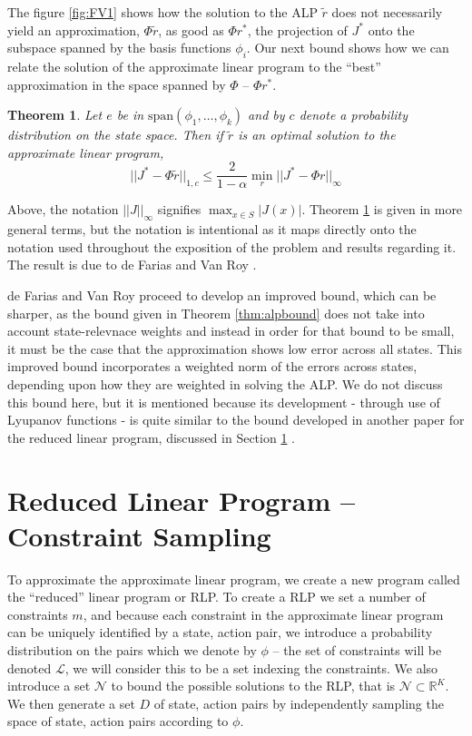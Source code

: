 \documentclass[12pt,reqno]{amsart}
\newtheorem{thm}{Theorem}[section]
\newcommand{\R}{\ensuremath{\mathbb{R}}}
\newcommand{\sN}{\mathcal{N}}
\newcommand{\sL}{\mathcal{L}}
\numberwithin{equation}{section}
\begin{document}
The figure \ref{fig:FV1} shows how the solution to the ALP $\tilde{r}$ does not necessarily yield an approximation, $\Phi\tilde{r}$, as good as $\Phi r^*$, the projection of $J^*$ onto the subspace spanned by the basis functions $\phi_i$. Our next bound shows how we can relate the solution of the approximate linear program to the ``best'' approximation in the space spanned by $\Phi$ -- $\Phi r^*$.

\begin{thm}\label{thm:alpbound2}
Let $e$ be in $\text{span}(\phi_1,\dots,\phi_k)$ and by $c$ denote a probability distribution on the state space. Then if $\tilde{r}$ is an optimal solution to the approximate linear program,
$$
||J^* - \Phi\tilde{r}||_{1,c} \leq \frac{2}{1-\alpha} \min_r || J^* - \Phi r||_{\infty}
$$
\end{thm}

Above, the notation $||J||_{\infty}$ signifies $\max_{x \in S} |J(x)|$. Theorem \ref{thm:alpbound2} is given in more general terms, but the notation is intentional as it maps directly onto the notation used throughout the exposition of the problem and results regarding it. The result is due to de Farias and Van Roy \cite{FV}.

de Farias and Van Roy proceed to develop an improved bound, which can be sharper, as the bound given in Theorem \ref{thm:alpbound} does not take into account state-relevnace weights and instead in order for that bound to be small, it must be the case that the approximation shows low error across all states. This improved bound incorporates a weighted norm of the errors across states, depending upon how they are weighted in solving the ALP. We do not discuss this bound here, but it is mentioned because its development - through use of Lyupanov functions - is quite similar to the bound developed in another paper for the reduced linear program, discussed in Section \ref{solve_alp:cs} \cite{FV2}.

\section{Reduced Linear Program -- Constraint Sampling} \label{solve_alp:cs}

To approximate the approximate linear program, we create a new program called the ``reduced'' linear program or RLP. To create a RLP we set a number of constraints $m$, and because each constraint in the approximate linear program can be uniquely identified by a state, action pair, we introduce a probability distribution on the pairs which we denote by $\phi$ -- the set of constraints will be denoted $\sL$, we will consider this to be a set indexing the constraints. We also introduce a set $\sN$ to bound the possible solutions to the RLP, that is $\sN \subset \R^K$. We then generate a set $D$ of state, action pairs by independently sampling the space of state, action pairs according to $\phi$.
\end{document}
